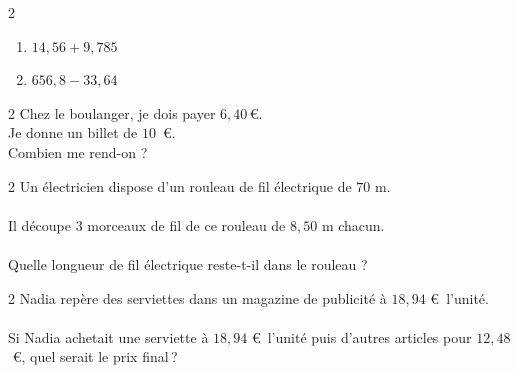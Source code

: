 \documentclass[11pt]{article}
\begin{document}
\begin{center}
\brouillon
\soin
\recherche 
{}
\end{center}

\phantom{0}
\vspace{.5cm}


\begin{exercicedevoir}
\begin{multicols}{2}
\begin{enumerate}[itemsep=2em]
\item  $14{,}56+9{,}785$ \\ \encart{5cm}
\item  $656{,}8-33{,}64$ \\ \encart{5cm}
\end{enumerate}
\end{multicols}
\end{exercicedevoir}


\begin{exercicedevoir}
\begin{multicols}{2}
Chez le boulanger, je dois payer  $6{,}40$\,€. \\
Je donne un billet de $10$ \,€. \\Combien me rend-on ? \\
\newcolumn
\encart{5cm}
\end{multicols}
\end{exercicedevoir}


\begin{exercicedevoir}
\begin{multicols}{2}
Un électricien dispose d’un rouleau de fil électrique de $70\text{ m}$. \\ \\
Il découpe $3$ morceaux de fil de ce rouleau de $8{,}50\text{ m}$ chacun.\\ \\
Quelle longueur de fil électrique reste-t-il dans le rouleau ? \\
\newcolumn
\encart{5cm}
\end{multicols}
\end{exercicedevoir}


\begin{exercicedevoir}

\begin{multicols}{2}
Nadia repère des serviettes dans un magazine de publicité à $18{,}94$\,\,€~l'unité. \\ \\
Si Nadia achetait une serviette à $18{,}94$\,\,€~l'unité puis d'autres articles pour $12{,}48$\,\,€, quel serait le prix final\,?  \\
\newcolumn
\encart{5cm}
\end{multicols}
\end{exercicedevoir}
\end{document}
